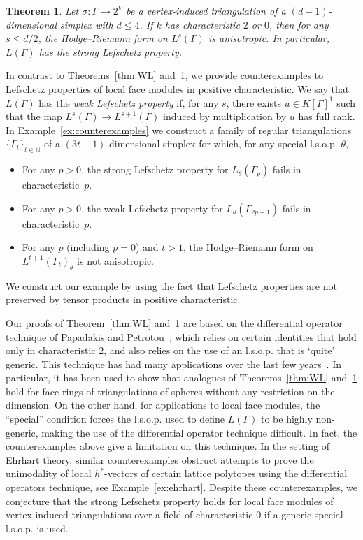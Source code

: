 \documentclass[11pt]{article}
\newtheorem{theo}{Theorem}[section]
\theoremstyle{definition}
\numberwithin{equation}{section}
\numberwithin{equation}{section}
\begin{document}
\begin{theo}\label{thm:SL}
Let $\sigma \colon \Gamma \to 2^V$ be a vertex-induced triangulation of a $(d-1)$-dimensional simplex with $d \le 4$. If $k$ has characteristic $2$ or $0$, then for any $s \le d/2$, the Hodge--Riemann form on $L^s(\Gamma)$ is anisotropic. In particular, $L(\Gamma)$ has the strong Lefschetz property. 

\end{theo}

In contrast to  Theorems~\ref{thm:WL} and~\ref{thm:SL}, 
we provide 
counterexamples to Lefschetz properties of local face modules in positive characteristic. We say that $L(\Gamma)$ has the \emph{weak Lefschetz property} if, for any $s$, there exists $u \in K[\Gamma]^1$ such that the map
$L^s(\Gamma) \to L^{s+1}(\Gamma)$ induced by multiplication by $u$ has full rank. 
In Example~\ref{ex:counterexamples} we construct a family of regular  triangulations $\{\Gamma_{t}\}_{t \in \mathbb{N}}$ of a $(3t-1)$-dimensional simplex for which, for any special l.s.o.p. $\theta$,
\begin{itemize}
		\item For any $p > 0$, the strong Lefschetz property for $L_{\theta}(\Gamma_p)$ fails in characteristic~$p$.
	\item For any $p > 0$, the weak Lefschetz property for $L_{\theta}(\Gamma_{2p - 1})$ fails in characteristic~$p$. 
	\item For any $p$ (including $p = 0$) and $t > 1$, 
	the Hodge--Riemann form on $L^{t + 1}(\Gamma_t)_{\theta}$ is not anisotropic. 
\end{itemize}
We construct our example by
using the fact that Lefschetz properties are not preserved by tensor products in positive characteristic.

Our proofs of Theorem~\ref{thm:WL} and~\ref{thm:SL} are based on the differential operator technique of Papadakis and Petrotou~\cite{PapadakisPetrotoug}, which relies on certain identities that hold only in characteristic $2$, and also relies on the use of an l.s.o.p. that is `quite' generic. This technique has had many applications over the last few years~\cite{APP,APPS,KaruXiao,Oba,LNS,KLS,moment}.
In particular, it has been used to show that analogues of Theorems~\ref{thm:WL} and~\ref{thm:SL} hold for face rings of triangulations of spheres without any restriction on the dimension. 
On the other hand, for applications to local face modules,  the ``special'' condition forces the l.s.o.p. used to define $L(\Gamma)$ to be highly non-generic, making  the use of the differential operator technique difficult. In fact, the counterexamples above 
give a limitation on this technique. 
In the setting of Ehrhart theory, similar counterexamples obstruct attempts to prove the unimodality of 
local $h^*$-vectors
of certain lattice polytopes using the differential operators technique, see Example~\ref{ex:ehrhart}. Despite these counterexamples, we conjecture that the strong Lefschetz property holds for local face modules of vertex-induced triangulations over a field of characteristic $0$ if a generic special l.s.o.p. is used. 
\end{document}
